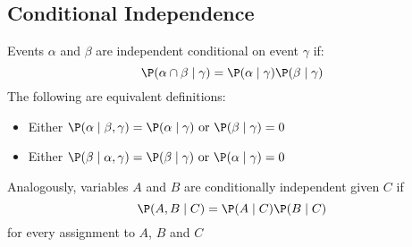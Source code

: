 \subsection{Conditional Independence}
	\begin{frame}
		Events $\alpha$ and $\beta$ are independent conditional on event $\gamma$ if:
			\[ \P( \alpha \cap \beta \mid \gamma ) = \P( \alpha \mid \gamma ) \P( \beta \mid \gamma ) \]
		The following are equivalent definitions:
		\begin{itemize}
			\item Either $\P( \alpha \mid \beta , \gamma ) = \P( \alpha \mid \gamma ) \text{ or } \P( \beta \mid \gamma ) = 0$
			\item Either $\P( \beta \mid \alpha , \gamma ) = \P( \beta \mid \gamma ) \text{ or } \P( \alpha \mid \gamma ) = 0$
		\end{itemize}
		Analogously, variables $A$ and $B$ are conditionally independent given $C$ if
			\[ \P( A , B \mid C ) = \P( A \mid C ) \P( B \mid C ) \]
		for every assignment to $A$, $B$ and $C$
	\end{frame}